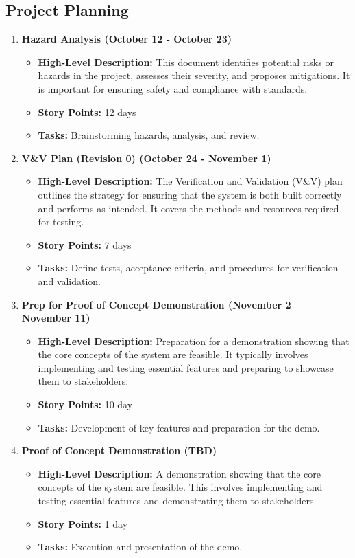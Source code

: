 \documentclass[12pt]{article}
\begin{document}
\subsection{Project Planning}
\begin{enumerate}
    \item \textbf{Hazard Analysis (October 12 - October 23)}
    \begin{itemize}
        \item \textbf{High-Level Description:} This document identifies potential risks or hazards in the project, assesses their severity,
         and proposes mitigations. It is important for ensuring safety and compliance with standards.
        \item \textbf{Story Points:} 12 days
        \item \textbf{Tasks:} Brainstorming hazards, analysis, and review.
    \end{itemize}

    \item \textbf{V\&V Plan (Revision 0) (October 24 - November 1)}
    \begin{itemize}
        \item \textbf{High-Level Description:} The Verification and Validation (V\&V) plan outlines the strategy for ensuring that the system
         is both built correctly and performs as intended. It covers the methods and resources required for testing.
        \item \textbf{Story Points:} 7 days
        \item \textbf{Tasks:} Define tests, acceptance criteria, and procedures for verification and validation.
    \end{itemize}

    \item \textbf{Prep for Proof of Concept Demonstration (November 2 – November 11)}
    \begin{itemize}
        \item \textbf{High-Level Description:} Preparation for a demonstration showing that the core concepts of the system are feasible. 
        It typically involves implementing and testing essential features and preparing to showcase them to stakeholders.
        \item \textbf{Story Points:} 10 day
        \item \textbf{Tasks:} Development of key features and preparation for the demo.
    \end{itemize}

    \item \textbf{Proof of Concept Demonstration (TBD)}
    \begin{itemize}
        \item \textbf{High-Level Description:} A demonstration showing that the core concepts of the system are feasible. This involves 
        implementing and testing essential features and demonstrating them to stakeholders.
        \item \textbf{Story Points:} 1 day
        \item \textbf{Tasks:} Execution and presentation of the demo.
    \end{itemize}


\end{enumerate}
\end{document}
